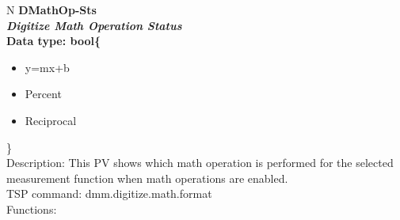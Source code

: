 \documentclass[openany]{article}
\begin{document}
		\begin{tabular}{N}
			\hline
			\bfseries DMathOp-Sts\label{pv:dmathop-sts} \\ \hline
			\emph{Digitize Math Operation Status} \\
			Data type: bool\{\begin{itemize}[noitemsep]
				\small
				\item[] y=mx+b
				\item[] Percent
				\item[] Reciprocal
			\end{itemize}\} \\
			Description: This PV shows which math operation is performed for the selected measurement function when math operations are enabled. \\
			TSP command: dmm.digitize.math.format \\
			Functions: \\
			\arrayrulecolor{\FuncTableBorderColor}

		\end{tabular}
\end{document}
